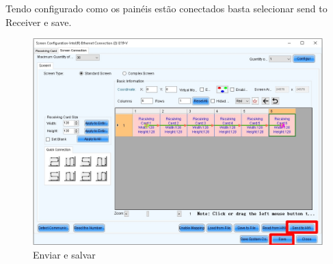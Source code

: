 \documentclass[12pt, a4paper]{article}
\begin{document}
\newpage
Tendo configurado como os painéis estão conectados basta selecionar send to Receiver e save.
\begin{figure}[!htb]
	\centering
	\includegraphics[width=\textwidth]{conexaoCp.jpeg}
	\caption{\label{fig:}Enviar e salvar}
\end{figure}

\cleardoublepage

\end{document}
